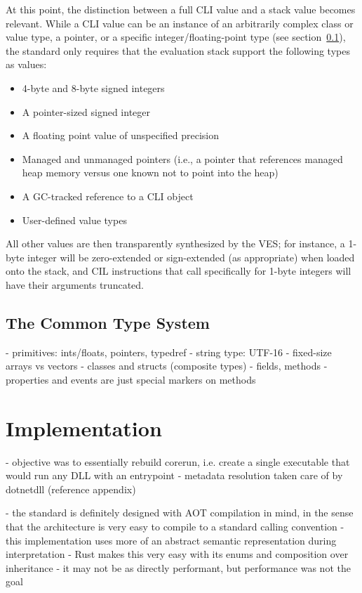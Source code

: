 At this point, the distinction between a full CLI value and a stack value becomes relevant.
While a CLI value can be an instance of an arbitrarily complex class or value type, a pointer, or a specific integer/floating-point type
(see section~\ref{sec:cts}),
the standard only requires that the evaluation stack support the following types as values:
\begin{itemize}
    \item 4-byte and 8-byte signed integers
    \item A pointer-sized signed integer
    \item A floating point value of unspecified precision
    \item Managed and unmanaged pointers (i.e., a pointer that references managed heap memory versus one known not to point into the heap)
    \item A GC-tracked reference to a CLI object
    \item User-defined value types
\end{itemize}
All other values are then transparently synthesized by the VES; for instance, a 1-byte integer will be zero-extended or sign-extended (as appropriate)
when loaded onto the stack, and CIL instructions that call specifically for 1-byte integers will have their arguments truncated.

\subsection{The Common Type System}\label{sec:cts}
- primitives: ints/floats, pointers, typedref
- string type: UTF-16
- fixed-size arrays vs vectors
- classes and structs (composite types)
    - fields, methods
    - properties and events are just special markers on methods

\section{Implementation}
- objective was to essentially rebuild corerun, i.e. create a single executable that would run any DLL with an entrypoint
- metadata resolution taken care of by dotnetdll (reference appendix)

- the standard is definitely designed with AOT compilation in mind, in the sense that the architecture is very easy to compile to a standard calling convention
- this implementation uses more of an abstract semantic representation during interpretation
    - Rust makes this very easy with its enums and composition over inheritance
    - it may not be as directly performant, but performance was not the goal

